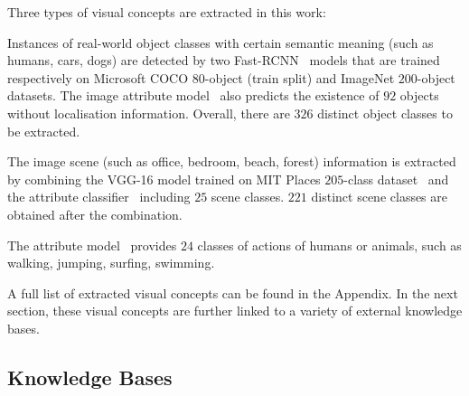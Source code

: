 \documentclass[10pt,journal]{IEEEtran}
\begin{document}
Three types of visual concepts are extracted in this work:

Instances of real-world object classes with certain semantic meaning (such as humans, cars, dogs)
are detected by two Fast-RCNN~\cite{girshick2015fast} models that are trained respectively on 
Microsoft COCO $80$-object (train split) and ImageNet $200$-object datasets.
The image attribute model~\cite{qi2015caption} also predicts the existence 
of $92$ objects without localisation information.
Overall, there are $326$ distinct object classes to be extracted.

The image scene (such as office, bedroom, beach, forest) 
information is extracted by combining 
the VGG-16 model trained on MIT Places $205$-class dataset~\cite{zhou2014learning} and
the attribute classifier~\cite{qi2015caption} including $25$ scene classes. 
$221$ distinct scene classes are obtained after the combination.


The attribute model~\cite{qi2015caption} provides $24$ classes of actions of humans or animals,
such as walking, jumping, surfing, swimming. 

A full list of extracted visual concepts can be found in the Appendix.
In the next section, these visual concepts are further linked to a variety of external knowledge bases.


\subsection{Knowledge Bases}
\end{document}
